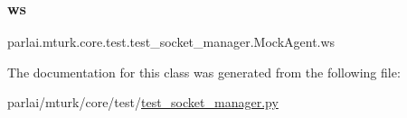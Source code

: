 \subsubsection{\texorpdfstring{ws}{ws}}
{\footnotesize\ttfamily parlai.\+mturk.\+core.\+test.\+test\+\_\+socket\+\_\+manager.\+Mock\+Agent.\+ws}



The documentation for this class was generated from the following file\+:\begin{DoxyCompactItemize}
\item 
parlai/mturk/core/test/\hyperlink{test_2test__socket__manager_8py}{test\+\_\+socket\+\_\+manager.\+py}\end{DoxyCompactItemize}
